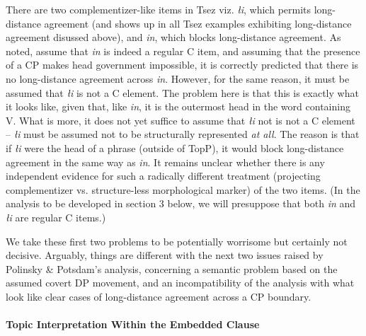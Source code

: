 \documentclass[output=paper
,modfonts
,nonflat]{langsci/langscibook}
\begin{document}
There are two comp\-lement\-izer-like items in Tsez viz. {\itshape {\l}i},
which permits long-distance agreement (and shows up in all Tsez
examples exhibiting long-distance agreement disussed above), and {\it
  \textcrlambda in}, which blocks long-distance agreement. As noted,
\cite{Polinsky&Potsdam:01} assume that {\itshape \textcrlambda in} is
indeed a regular C item, and assuming that the presence of a CP makes
head government impossible, it is correctly predicted that there is no
long-distance agreement across {\itshape \textcrlambda in}.
However,  for the same reason, it must be assumed that {\itshape {\l}i} is
not a C element. The problem here is that this is exactly what
it looks like, given that, like {\itshape \textcrlambda in}, it is the
outermost head in the word containing V. What is more, it does not yet suffice to
assume that  {\itshape {\l}i} not is not a C element -- {\itshape {\l}i} must  be
assumed not to be structurally represented {\itshape at all}. The reason is
that if {\itshape {\l}i} were the head of a phrase (outside of TopP), it would block
long-distance agreement in the same way as {\itshape \textcrlambda in}. 
It remains unclear whether there is any independent evidence for such
a radically different treatment (projecting complementizer
vs. structure-less morphological marker) of the two items. (In the
analysis to be developed in section 3 below, we will presuppose that
both  {\itshape \textcrlambda in} and {\itshape {\l}i} are regular C items.)

We take these first two problems to be potentially worrisome but
certainly not decisive. Arguably, things are different with the next
two issues raised by Polinsky \& Potsdam's analysis, concerning a
semantic problem based on the assumed covert DP movement, and an
incompatibility of the analysis with what look like clear cases of
long-distance agreement across a CP boundary.


\paragraph{Topic Interpretation Within the Embedded Clause}
\end{document}

